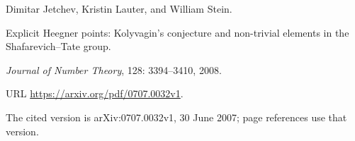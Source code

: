 Dimitar Jetchev, Kristin Lauter, and William Stein.

\newblock Explicit {H}eegner points: {K}olyvagin's conjecture and non-trivial
  elements in the {S}hafarevich--{T}ate group.

\newblock \emph{Journal of Number Theory}, 128: 3394--3410, 2008.

\newblock URL \url{https://arxiv.org/pdf/0707.0032v1}.

\newblock The cited version is arXiv:0707.0032v1, 30 June 2007; page references use that version.
